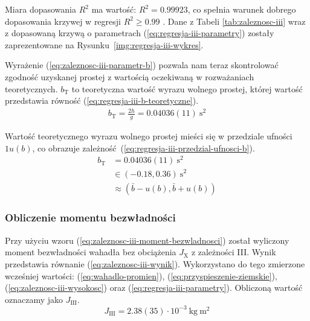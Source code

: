 \documentclass[twocolumn, a4paper, polish, 10pt]{article}
\newcommand{\JX}{\ensuremath{ J_{\mathrm{X}} }}
\newcommand{\JXn}[1]{\ensuremath{ J_{\mathrm{#1}} }}
\begin{document}
Miara dopasowania $R^2$ ma wartość: $R^2 = 0.99923$, co spełnia warunek dobrego dopasowania krzywej w regresji $R^2 \geq 0.99$ \cite{epa-8000d}.
Dane z Tabeli \ref{tab:zaleznosc-iii} wraz z dopasowaną krzywą o parametrach (\ref{eq:regresja-iii-parametry}) zostały zaprezentowane na Rysunku~\ref{img:regresja-iii-wykres}.


Wyrażenie (\ref{eq:zaleznosc-iii-parametr-b}) pozwala nam teraz skontrolować zgodność uzyskanej prostej z wartością oczekiwaną w rozważaniach teoretycznych.
$b_{\mathrm{T}}$ to teoretyczna wartość wyrazu wolnego prostej, której wartość przedstawia równość (\ref{eq:regresja-iii-b-teoretyczne}).
\begin{equation}
\begin{split}
    b_{\mathrm{T}} = \frac{2h}{g} = 0.04036(11)~\mathrm{s^2}
    \label{eq:regresja-iii-b-teoretyczne}
\end{split}
\end{equation}

Wartość teoretycznego wyrazu wolnego prostej mieści się w przedziale ufności $1u(b)$, co obrazuje zależność~(\ref{eq:regresja-iii-przedzial-ufnosci-b}).
\begin{equation}
\begin{split}
    b_{\mathrm{T}} &= 0.04036(11)~\mathrm{s^2} \\
    &\in \left( -0.18, 0.36 \right)~\mathrm{s^2} \\
    &\approx \left(
        \bar{b} - u(b),
        \bar{b} + u(b)
    \right)
    \label{eq:regresja-iii-przedzial-ufnosci-b}
\end{split}
\end{equation}

\subsubsection{Obliczenie momentu bezwładności}
Przy użyciu wzoru (\ref{eq:zaleznosc-iii-moment-bezwladnosci}) został wyliczony moment bezwładności wahadła bez obciążenia $\JX$ z zależności III. Wynik przedstawia równanie (\ref{eq:zaleznosc-iii-wynik}).
Wykorzystano do tego zmierzone wcześniej wartości: (\ref{eq:wahadlo-promien}), (\ref{eq:przyspieszenie-ziemskie}), (\ref{eq:zaleznosc-iii-wysokosc}) oraz (\ref{eq:regresja-iii-parametry}). Obliczoną wartość oznaczamy jako $\JXn{III}$.
\begin{equation}
    \JXn{III} = 2.38(35) \cdot 10^{-3}~\mathrm{kg~m^2}
    \label{eq:zaleznosc-iii-wynik}
\end{equation}
\end{document}
